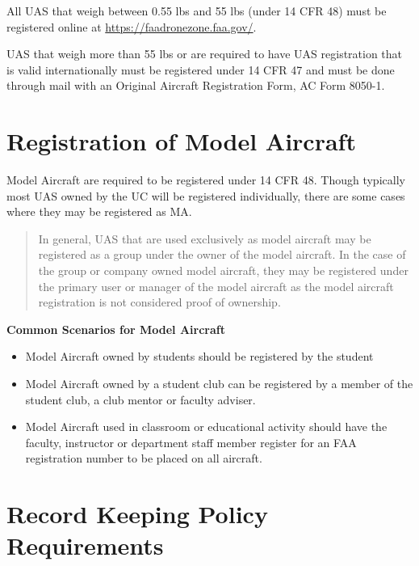 \documentclass[
]{book}
\providecommand{\tightlist}{%
  \setlength{\itemsep}{0pt}\setlength{\parskip}{0pt}}
\begin{document}
All UAS that weigh between 0.55 lbs and 55 lbs (under 14 CFR 48) must be registered online at \url{https://faadronezone.faa.gov/}.

UAS that weigh more than 55 lbs or are required to have UAS registration that is valid internationally must be registered under 14 CFR 47 and must be done through mail with an Original Aircraft Registration Form, AC Form 8050-1.

\hypertarget{registration-of-model-aircraft}{%
\section{Registration of Model Aircraft}\label{registration-of-model-aircraft}}

Model Aircraft are required to be registered under 14 CFR 48. Though typically most UAS owned by the UC will be registered individually, there are some cases where they may be registered as MA.

\begin{quote}
In general, UAS that are used exclusively as model aircraft may be registered as a group under the owner of the model aircraft. In the case of the group or company owned model aircraft, they may be registered under the primary user or manager of the model aircraft as the model aircraft registration is not considered proof of ownership.
\end{quote}

\textbf{Common Scenarios for Model Aircraft}

\begin{itemize}
\tightlist
\item
  Model Aircraft owned by students should be registered by the student
\item
  Model Aircraft owned by a student club can be registered by a member of the student club, a club mentor or faculty adviser.
\item
  Model Aircraft used in classroom or educational activity should have the faculty, instructor or department staff member register for an FAA registration number to be placed on all aircraft.
\end{itemize}

\hypertarget{record-keeping-policy-requirements}{%
\section{Record Keeping Policy Requirements}\label{record-keeping-policy-requirements}}
\end{document}
